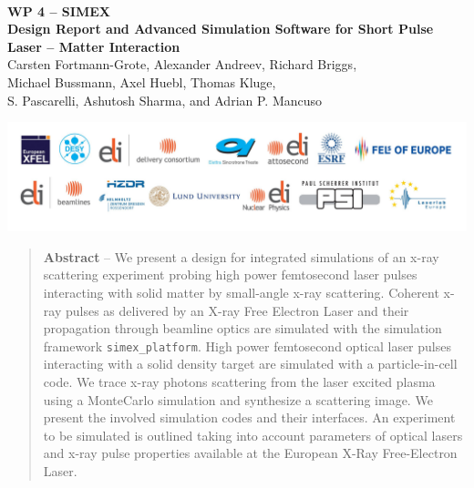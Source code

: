 \documentclass[12pt]{scrartcl}
\begin{document}
\makeatletter
\begin{titlepage}
\thispagestyle{scrheadings}
\begin{center}
$~$\\
\vspace{2cm}
\Huge{\textbf{WP 4 -- SIMEX\\[1cm]Design Report and Advanced Simulation Software for Short Pulse Laser -- Matter Interaction}}\\[5mm]
\vspace{2cm}
\large{%
Carsten Fortmann-Grote, Alexander Andreev, Richard Briggs,\\ Michael Bussmann,
  Axel Huebl, Thomas Kluge,\\
 S. Pascarelli, Ashutosh Sharma, and Adrian P. Mancuso\\
 }
\vspace{1cm}
\@date
\end{center}
\vfill
\includegraphics[width=\textwidth]{./PartnerLogos.pdf}
\normalfont
\end{titlepage}
\makeatother

\tableofcontents
\begin{abstract}
  \noindent%
  \textbf{Abstract} -- We present a design for integrated simulations of an x-ray scattering
  experiment probing high power femtosecond laser pulses interacting with solid
  matter by small-angle x-ray scattering.
  Coherent x-ray pulses as delivered by an X-ray Free Electron Laser
  and their propagation through beamline optics are simulated with the
  simulation framework \texttt{simex\_platform}. High power femtosecond optical
  laser pulses interacting with a solid density target are simulated with
  a particle-in-cell code. We trace x-ray photons scattering from the laser excited
  plasma using a MonteCarlo simulation and synthesize a scattering image.
  We present the involved simulation codes and their interfaces.
  An experiment to be simulated is outlined taking into account parameters of optical lasers and
  x-ray pulse properties available at the European X-Ray Free-Electron Laser.
\end{abstract}
%
\end{document}
